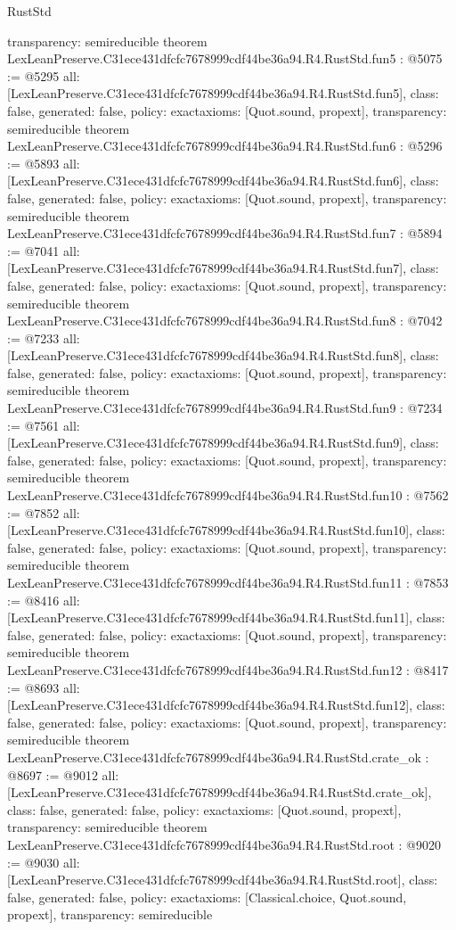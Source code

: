 \begin{lexlean}{RustStd}
\begin{coremodule}
{  transparency: semireducible
}
theorem LexLeanPreserve.C31ece431dfcfc7678999cdf44be36a94.R4.RustStd.fun5 : @5075 := @5295 {
  all: [LexLeanPreserve.C31ece431dfcfc7678999cdf44be36a94.R4.RustStd.fun5],
  class: false,
  generated: false,
  policy: exact{axioms: [Quot.sound, propext]},
  transparency: semireducible
}
theorem LexLeanPreserve.C31ece431dfcfc7678999cdf44be36a94.R4.RustStd.fun6 : @5296 := @5893 {
  all: [LexLeanPreserve.C31ece431dfcfc7678999cdf44be36a94.R4.RustStd.fun6],
  class: false,
  generated: false,
  policy: exact{axioms: [Quot.sound, propext]},
  transparency: semireducible
}
theorem LexLeanPreserve.C31ece431dfcfc7678999cdf44be36a94.R4.RustStd.fun7 : @5894 := @7041 {
  all: [LexLeanPreserve.C31ece431dfcfc7678999cdf44be36a94.R4.RustStd.fun7],
  class: false,
  generated: false,
  policy: exact{axioms: [Quot.sound, propext]},
  transparency: semireducible
}
theorem LexLeanPreserve.C31ece431dfcfc7678999cdf44be36a94.R4.RustStd.fun8 : @7042 := @7233 {
  all: [LexLeanPreserve.C31ece431dfcfc7678999cdf44be36a94.R4.RustStd.fun8],
  class: false,
  generated: false,
  policy: exact{axioms: [Quot.sound, propext]},
  transparency: semireducible
}
theorem LexLeanPreserve.C31ece431dfcfc7678999cdf44be36a94.R4.RustStd.fun9 : @7234 := @7561 {
  all: [LexLeanPreserve.C31ece431dfcfc7678999cdf44be36a94.R4.RustStd.fun9],
  class: false,
  generated: false,
  policy: exact{axioms: [Quot.sound, propext]},
  transparency: semireducible
}
theorem LexLeanPreserve.C31ece431dfcfc7678999cdf44be36a94.R4.RustStd.fun10 : @7562 := @7852 {
  all: [LexLeanPreserve.C31ece431dfcfc7678999cdf44be36a94.R4.RustStd.fun10],
  class: false,
  generated: false,
  policy: exact{axioms: [Quot.sound, propext]},
  transparency: semireducible
}
theorem LexLeanPreserve.C31ece431dfcfc7678999cdf44be36a94.R4.RustStd.fun11 : @7853 := @8416 {
  all: [LexLeanPreserve.C31ece431dfcfc7678999cdf44be36a94.R4.RustStd.fun11],
  class: false,
  generated: false,
  policy: exact{axioms: [Quot.sound, propext]},
  transparency: semireducible
}
theorem LexLeanPreserve.C31ece431dfcfc7678999cdf44be36a94.R4.RustStd.fun12 : @8417 := @8693 {
  all: [LexLeanPreserve.C31ece431dfcfc7678999cdf44be36a94.R4.RustStd.fun12],
  class: false,
  generated: false,
  policy: exact{axioms: [Quot.sound, propext]},
  transparency: semireducible
}
theorem LexLeanPreserve.C31ece431dfcfc7678999cdf44be36a94.R4.RustStd.crate_ok : @8697 := @9012 {
  all: [LexLeanPreserve.C31ece431dfcfc7678999cdf44be36a94.R4.RustStd.crate_ok],
  class: false,
  generated: false,
  policy: exact{axioms: [Quot.sound, propext]},
  transparency: semireducible
}
theorem LexLeanPreserve.C31ece431dfcfc7678999cdf44be36a94.R4.RustStd.root : @9020 := @9030 {
  all: [LexLeanPreserve.C31ece431dfcfc7678999cdf44be36a94.R4.RustStd.root],
  class: false,
  generated: false,
  policy: exact{axioms: [Classical.choice, Quot.sound, propext]},
  transparency: semireducible
}


\end{coremodule}
\end{lexlean}
